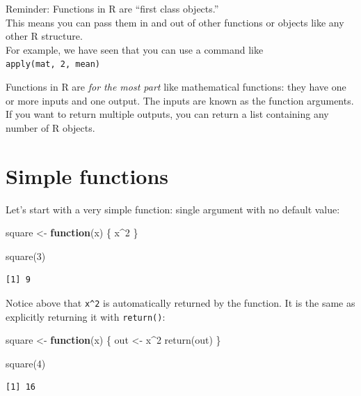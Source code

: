 \documentclass[
]{book}
\newenvironment{Shaded}{\begin{snugshade}}{\end{snugshade}}
\newcommand{\ControlFlowTok}[1]{\textcolor[rgb]{0.13,0.29,0.53}{\textbf{#1}}}
\newcommand{\DecValTok}[1]{\textcolor[rgb]{0.00,0.00,0.81}{#1}}
\newcommand{\FunctionTok}[1]{\textcolor[rgb]{0.00,0.00,0.00}{#1}}
\newcommand{\NormalTok}[1]{#1}
\newcommand{\OtherTok}[1]{\textcolor[rgb]{0.56,0.35,0.01}{#1}}
\newcommand{\SpecialCharTok}[1]{\textcolor[rgb]{0.00,0.00,0.00}{#1}}
\begin{document}
Reminder: Functions in R are ``first class objects.''\\
This means you can pass them in and out of other functions or objects like any other R structure.\\
For example, we have seen that you can use a command like \texttt{apply(mat,\ 2,\ mean)}

Functions in R are \emph{for the most part} like mathematical functions: they have one or more inputs and one output. The inputs are known as the function arguments. If you want to return multiple outputs, you can return a list containing any number of R objects.

\hypertarget{simple-functions}{%
\section{Simple functions}\label{simple-functions}}

Let's start with a very simple function: single argument with no default value:

\begin{Shaded}
\begin{Highlighting}[]
\NormalTok{square }\OtherTok{\textless{}{-}} \ControlFlowTok{function}\NormalTok{(x) \{}
\NormalTok{  x}\SpecialCharTok{\^{}}\DecValTok{2}
\NormalTok{\}}

\FunctionTok{square}\NormalTok{(}\DecValTok{3}\NormalTok{)}
\end{Highlighting}
\end{Shaded}

\begin{verbatim}
[1] 9
\end{verbatim}

Notice above that \texttt{x\^{}2} is automatically returned by the function. It is the same as explicitly returning it with \texttt{return()}:

\begin{Shaded}
\begin{Highlighting}[]
\NormalTok{square }\OtherTok{\textless{}{-}} \ControlFlowTok{function}\NormalTok{(x) \{}
\NormalTok{  out }\OtherTok{\textless{}{-}}\NormalTok{ x}\SpecialCharTok{\^{}}\DecValTok{2}
  \FunctionTok{return}\NormalTok{(out)}
\NormalTok{\}}

\FunctionTok{square}\NormalTok{(}\DecValTok{4}\NormalTok{)}
\end{Highlighting}
\end{Shaded}

\begin{verbatim}
[1] 16
\end{verbatim}
\end{document}

